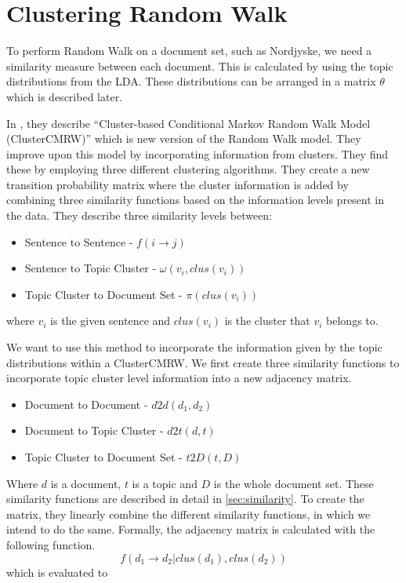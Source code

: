 \section{Clustering Random Walk}
To perform Random Walk on a document set, such as Nordjyske, we need a similarity measure between each document.
This is calculated by using the topic distributions from the \gls{LDA}.
These distributions can be arranged in a matrix $\theta$ which is described later.

In \cite{ClusterPageRank}, they describe ``Cluster-based Conditional Markov Random Walk Model (ClusterCMRW)'' which is new version of the Random Walk model. They improve upon this model by incorporating information from clusters. 
They find these by employing three different clustering algorithms.
They create a new transition probability matrix where the cluster information is added by combining three similarity functions based on the information levels present in the data.
They describe three similarity levels between:
\begin{itemize}
    \item Sentence to Sentence - $f(i \rightarrow j)$
    \item Sentence to Topic Cluster - $\omega(v_i, clus(v_i))$
    \item Topic Cluster to Document Set - $\pi(clus(v_i))$
\end{itemize}
where $v_i$ is the given sentence and $clus(v_i)$ is the cluster that $v_i$ belongs to.

We want to use this method to incorporate the information given by the topic distributions within a ClusterCMRW. 
We first create three similarity functions to incorporate topic cluster level information into a new adjacency matrix.
\begin{itemize}
    \item Document to Document - $d2d(d_1, d_2)$
    \item Document to Topic Cluster - $d2t(d,t)$
    \item Topic Cluster to Document Set - $t2D(t, D)$
\end{itemize}

\noindent
Where $d$ is a document, $t$ is a topic and $D$ is the whole document set.
These similarity functions are described in detail in \autoref{sec:similarity}.
To create the matrix, they linearly combine the different similarity functions, in which we intend to do the same.
Formally, the adjacency matrix is calculated with the following function.
$$ f(d_1 \rightarrow d_2 | clus(d_1), clus(d_2)) $$
which is evaluated to 

